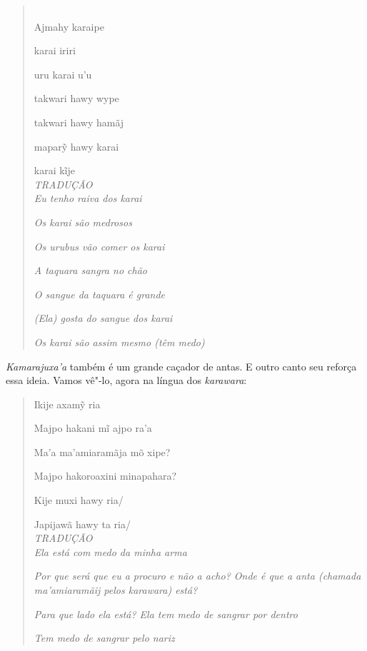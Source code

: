 \begin{quote}
\forceindent
{} \\

Ajmahy karaipe

karai iriri

uru karai u'u

takwari hawy wype

takwari hawy hamãj

maparỹ hawy karai

karai kĩje\\

\emph{TRADUÇÃO}\\

\emph{Eu tenho raiva dos \emph{karai}}

\emph{Os \emph{karai} são medrosos}

\emph{Os urubus vão comer os \emph{karai}}

\emph{A taquara sangra no chão}

\emph{O sangue da taquara é grande}

\emph{(Ela) gosta do sangue dos \emph{karai}}

\emph{Os \emph{karai são assim mesmo} (têm medo)}
\end{quote}

\emph{Kamarajuxa'a} também é um grande caçador de antas. E outro canto
seu reforça essa ideia. Vamos vê"-lo, agora na língua dos
\emph{karawara}:

\begin{quote}
\forceindent
Ikije axamỹ ria

Majpo hakani mĩ ajpo ra'a 

Ma'a ma'amiaramãja mõ xipe?

Majpo hakoroaxini minapahara?

Kije muxi hawy ria/

Japijawã hawy ta ria/\\

\emph{TRADUÇÃO}\\

\emph{Ela está com medo da minha arma}

\emph{Por que será que eu a procuro e não a acho? Onde é que a anta (chamada
\emph{ma'amiaramãij} pelos \emph{karawara}) está?}

\emph{Para que lado ela está? Ela tem medo de sangrar por dentro}

\emph{Tem medo de sangrar pelo nariz}
\end{quote}

